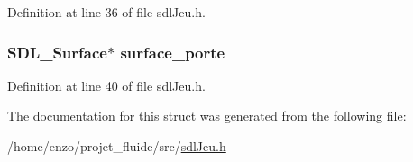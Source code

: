 Definition at line 36 of file sdl\-Jeu.\-h.

\hypertarget{structsdl_jeu_a0421d88f322a7e945216dacac7b0821e}{
\subsubsection[{surface\-\_\-porte}]{\setlength{\rightskip}{0pt plus 5cm}S\-D\-L\-\_\-\-Surface$\ast$ surface\-\_\-porte}}\label{structsdl_jeu_a0421d88f322a7e945216dacac7b0821e}


Definition at line 40 of file sdl\-Jeu.\-h.



The documentation for this struct was generated from the following file\-:\begin{DoxyCompactItemize}
\item 
/home/enzo/projet\-\_\-fluide/src/\hyperlink{sdl_jeu_8h}{sdl\-Jeu.\-h}\end{DoxyCompactItemize}
